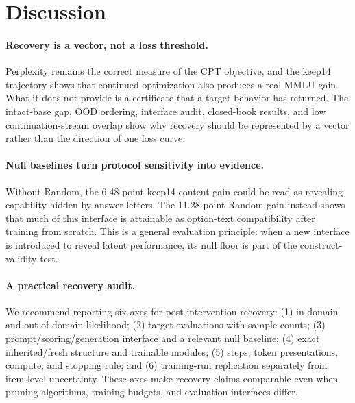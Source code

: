 \section{Discussion}
\label{sec:discussion}

\paragraph{Recovery is a vector, not a loss threshold.}
Perplexity remains the correct measure of the CPT objective, and the keep14
trajectory shows that continued optimization also produces a real MMLU gain.
What it does not provide is a certificate that a target behavior has returned.
The intact-base gap, OOD ordering, interface audit, closed-book results, and
low continuation-stream overlap show why recovery should be represented by a
vector rather than the direction of one loss curve.

\paragraph{Null baselines turn protocol sensitivity into evidence.}
Without Random, the 6.48-point keep14 content gain could be read as revealing
capability hidden by answer letters. The 11.28-point Random gain instead shows
that much of this interface is attainable as option-text compatibility after
training from scratch. This is a general evaluation principle: when a new
interface is introduced to reveal latent performance, its null floor is part
of the construct-validity test.

\paragraph{A practical recovery audit.}
We recommend reporting six axes for post-intervention recovery:
(1) in-domain and out-of-domain likelihood;
(2) target evaluations with sample counts;
(3) prompt/scoring/generation interface and a relevant null baseline;
(4) exact inherited/fresh structure and trainable modules;
(5) steps, token presentations, compute, and stopping rule; and
(6) training-run replication separately from item-level uncertainty.
These axes make recovery claims comparable even when pruning algorithms,
training budgets, and evaluation interfaces differ.

